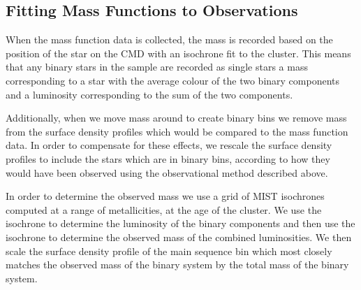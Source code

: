 \subsection{Fitting Mass Functions to Observations}

When the mass function data is collected, the mass is recorded based on the position of the star on
the CMD with an isochrone fit to the cluster. This means that any binary stars in the sample are
recorded as single stars a mass corresponding to a star with the average colour of the two binary
components and a luminosity corresponding to the sum of the two components.

Additionally, when we move mass around to create binary bins we remove mass from the surface density
profiles which would be compared to the mass function data. In order to compensate for these
effects, we rescale the surface density profiles to include the stars which are in binary bins,
according to how they would have been observed using the observational method described above.

In order to determine the observed mass we use a grid of MIST isochrones computed at a range of
metallicities, at the age of the cluster. We use the isochrone to determine the luminosity of the
binary components and then use the isochrone to determine the observed mass of the combined
luminosities. We then scale the surface density profile of the main sequence bin which most closely
matches the observed mass of the binary system by the total mass of the binary system.